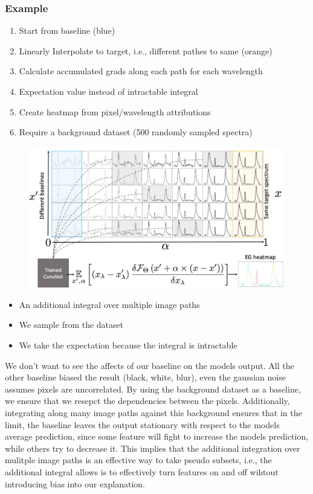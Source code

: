 \subsubsection*{Example}
\begin{enumerate}
    \item Start from baseline (blue)
    \item Linearly Interpolate to target, i.e., different pathes to same (orange)
    \item Calculate accumulated grads along each path for each wavelength
    \item Expectation value instead of intractable integral
    \item Create heatmap from pixel/wavelength attributions
    \item Require a background dataset (500 randomly sampled spectra)
\end{enumerate}
\begin{figure}[!h]
    \includegraphics[width = \columnwidth]{figures/XAI3/ShapleyValuesXGRADExample.png}
\end{figure}
\begin{itemize}
    \item An additional integral over multiple image paths
    \item We sample from the dataset
    \item We take the expectation because the integral is intractable
\end{itemize}
We don't want to see the affects of our baseline on the models output.
All the other baseline biased the result (black, white, blur), even the gaussian noise assumes pixels are uncorrelated.
By using the background dataset as a baseline, we ensure that we resepct the dependencies between the pixels.
Additionally, integrating along many image paths against this background ensures that in the limit, the baseline leaves the output stationary with respect to the models average prediction, since some feature will fight to increase the models prediction, while others try to decrease it.
This implies that the additional integration over mulitple image paths is an effective way to take pseudo subsets, i.e., the additional integral allows is to effectively turn features on and off wihtout introducing bias into our explanation.

